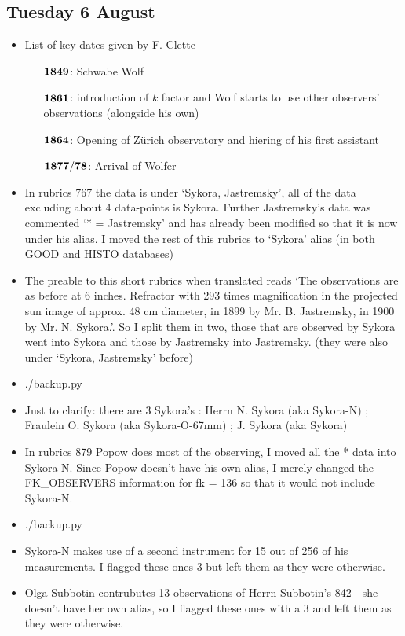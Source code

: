 \documentclass[12pt]{article}
\begin{document}
\subsection{Tuesday 6 August}
\begin{itemize}
    \item List of key dates given by F. Clette
    \begin{itemize}
        \item[$\bold{1849}$:] Schwabe Wolf
        \item[$\bold{1861}$:] introduction of $k$ factor and Wolf starts to use other observers' observations (alongside his own)
        \item[$\bold{1864}$:] Opening of Zürich observatory and hiering of his first assistant
        \item[$\bold{1877 / 78}$:] Arrival of Wolfer
    \end{itemize}
    \item In rubrics 767 the data is under `Sykora, Jastremsky', all of the data excluding about 4 data-points is Sykora. Further Jastremsky's data was commented `* = Jastremsky' and has already been modified so that it is now under his alias. I moved the rest of this rubrics to `Sykora' alias (in both GOOD and HISTO databases)
    \item The preable to this short rubrics when translated reads `The observations are as before at 6 inches. Refractor with 293 times magnification in the projected sun image of approx. 48 cm diameter, in 1899 by Mr. B. Jastremsky, in 1900 by Mr. N. Sykora.'. So I split them in two, those that are observed by Sykora went into Sykora and those by Jastremsky into Jastremsky. (they were also under `Sykora, Jastremsky' before)
    \item ./backup.py
    \item Just to clarify: there are 3 Sykora's : Herrn N. Sykora (aka Sykora-N) ; Fraulein O. Sykora (aka Sykora-O-67mm) ; J. Sykora (aka Sykora)
    \item In rubrics 879 Popow does most of the observing, I moved all the * data into Sykora-N. Since Popow doesn't have his own alias, I merely changed the FK\_OBSERVERS information for fk = 136 so that it would not include Sykora-N. 
    \item ./backup.py
    \item Sykora-N makes use of a second instrument for 15 out of 256 of his measurements. I flagged these ones 3 but left them as they were otherwise.
    \item Olga Subbotin contrubutes 13 observations of Herrn Subbotin's 842 - she doesn't have her own alias, so I flagged these ones with a 3 and left them as they were otherwise.

\end{itemize}
\end{document}
